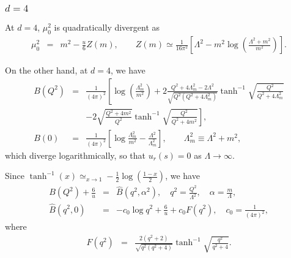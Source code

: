 \documentclass[preprint]{ptephy_v1}%
\begin{document}
\subsubsection{$d=4$}
At $d=4$, $\mu_0^2$ is quadratically divergent as
\begin{eqnarray}
\mu_0^2 &= & m^2-\frac{u}{6} Z(m), \qquad Z(m)\simeq \frac{1}{ 16\pi^2}\left[\Lambda^2- m^2\log \left(\frac{\Lambda^2+m^2}{m^2} \right)\right].
\end{eqnarray} 

On the other hand,  at $d=4$, we have
\begin{eqnarray}
B(Q^2)&=&  \frac{1}{(4\pi)^2}\left[ \log\left(\frac{\Lambda_m^2}{m^2}\right)
+2\frac{Q^2+4\Lambda_m^2-2\Lambda^2}{\sqrt{Q^2(Q^2+4\Lambda_m^2)}}\tanh^{-1}
\sqrt{\frac{Q^2}{Q^2+4\Lambda_m^2}}\right. \nonumber \\
&& -\left. 2\sqrt{\frac{Q^2+4m^2}{Q^2}}\tanh^{-1}\sqrt{\frac{Q^2}{Q^2+4m^2}}\right] , \\
B(0) &=& \frac{1}{(4\pi)^2}\left[\log \frac{\Lambda_m^2}{m^2}-\frac{\Lambda^2}{\Lambda_m^2}\right],
\qquad \Lambda_m^2\equiv\Lambda^2+m^2, 
\end{eqnarray}
which diverge logarithmically, so that $u_r(s) =0$ as $\Lambda\rightarrow\infty$.


Since $ \tanh^{-1} (x) \simeq_{x\to 1} -\frac{1}{2}\log\left(\frac{1-x}{2}\right)$,
we have
\begin{eqnarray}
B(Q^2) +\frac{6}{u}&=&\hat B\left(q^2, \alpha^2\right), \quad q^2=\frac{Q^2}{\Lambda^2}, \quad \alpha =\frac{m}{\Lambda}, \\
\hat B(q^2, 0) &=& -c_0 \log q^2 + \frac{6}{u}+ c_0 F(q^2), \quad c_0 = \frac{1}{(4\pi)^2},
\end{eqnarray}
where
\begin{eqnarray}
F(q^2) &=& \frac{2(q^2+2)}{\sqrt{q^2(q^2+4)}}\tanh^{-1}\sqrt{\frac{q^2}{q^2+4}} .
\end{eqnarray}
\end{document}
